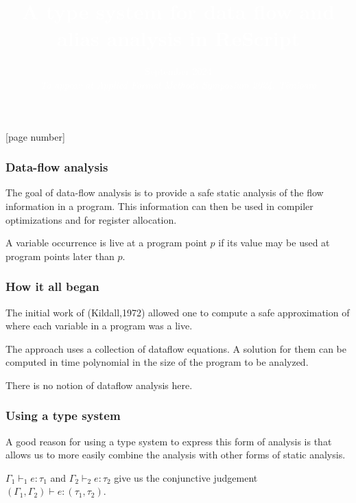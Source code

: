 \documentclass{beamer}
\title{\textcolor{white}{\textbf{A type system for data flow and alias analysis in ReScript}}}
\author{\textcolor{white}{Nicky Ask Lund  \and Hans Hüttel}}
\date{\textcolor{white}{September 2024} \\[4mm]
\textcolor{white}{\textsl{To appear at Applied Formal Methods Symposium 2024, Timi{\textcommabelow{s}}oara}}}
\begin{document}
{
[page number]
\maketitle
}

\begin{frame}
  \frametitle{Data-flow analysis}

  The goal of data-flow analysis is to provide a safe static analysis
  of the flow information in a program. This information can then be
  used in compiler optimizations and for register allocation.

  A variable occurrence is live at a program point $p$ if its value
  may be used at program points later than $p$.

\end{frame}

\begin{frame}
  \frametitle{How it all began}

The initial work of (Kildall,1972) allowed one to compute a safe approximation
of where each variable in a program was a live.

The approach uses a collection of dataflow equations. A solution for
them can be computed in time polynomial in the size of the program to
be analyzed.

There is no notion of dataflow analysis here.
\end{frame}

\begin{frame}
  \frametitle{Using a type system}

  A good reason for using a type system to express this form of
  analysis is that allows us to more easily combine the analysis with
  other forms of static analysis.

  $\Gamma_1 \vdash_1 e : \tau_1$ and $\Gamma_2 \vdash_2 e : \tau_2$
  give us the conjunctive judgement $(\Gamma_1,\Gamma_2) \vdash e :
  (\tau_1,\tau_2)$.
  
\end{frame}
\end{document}
